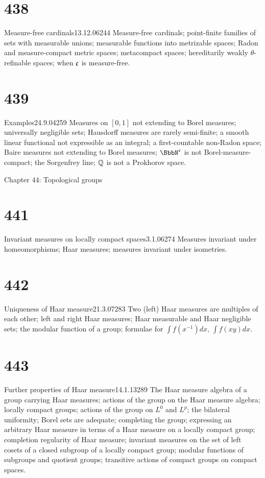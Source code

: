 \section{438}{Measure-free cardinals}{13.12.06}{244}{}
{Measure-free cardinals;  point-finite families of sets with
measurable unions;  measurable functions into metrizable spaces;  Radon
and measure-compact metric spaces;  metacompact spaces;  hereditarily
weakly $\theta$-refinable spaces;  when $\frak{c}$ is measure-free.}

\section{439}{Examples}{24.9.04}{259}{}
{Measures on $[0,1]$ not extending to Borel measures;  universally
negligible sets;  Hausdorff measures are rarely semi-finite;  a smooth
linear functional not expressible as an integral;  a first-countable
non-Radon space;  Baire measures not extending to Borel measures;
$\BbbN^{\frak{c}}$ is not Borel-measure-compact;  the
Sorgenfrey line;  $\Bbb{Q}$ is not a Prokhorov space.}


Chapter 44: Topological groups


\section{441}{Invariant measures on locally compact
spaces}{3.1.06}{274}{}
{Measures invariant under homeomorphisms;  Haar measures;
measures invariant under isometries.}

\section{442}{Uniqueness of Haar measure}{21.3.07}{283}{}
{Two (left) Haar measures are multiples of each other;  left and
right Haar measures;  Haar measurable and Haar negligible sets;  the
modular function of a group;  formulae for ${\int}f(x^{-1})dx$,
${\int}f(xy)dx$.}

\section{443}{Further properties of Haar measure}{14.1.13}{289}{}
{The Haar measure algebra of a group carrying Haar measures;
actions of the group on the Haar measure algebra;  locally compact
groups;  actions of the group on $L^0$ and $L^p$;  the bilateral
uniformity;  Borel sets are adequate;  completing the group;  expressing
an arbitrary Haar measure in terms of a Haar measure on a locally
compact group;  completion regularity of Haar measure;  invariant
measures on the set of left cosets of a closed subgroup of a locally
compact group;  modular functions of subgroups and quotient groups;
transitive actions of compact groups on compact spaces.}

